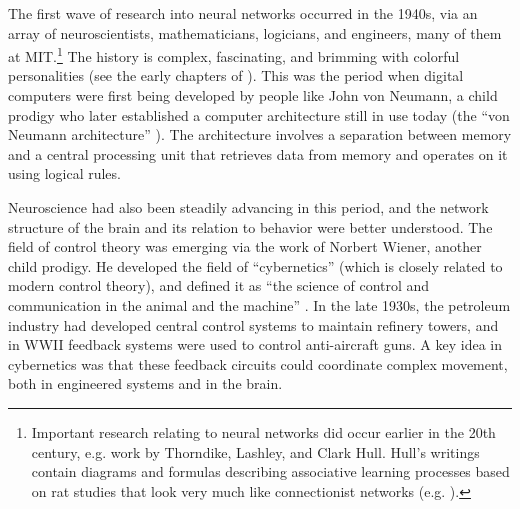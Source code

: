 The first wave of research into neural networks occurred in the 1940s, via an array of neuroscientists, mathematicians, logicians, and engineers, many of them at MIT.\footnote{Important research relating to neural networks did occur earlier in the 20th century, e.g. work by Thorndike, Lashley, and Clark Hull. Hull's writings contain diagrams and formulas describing associative learning processes based on rat studies that look very much like connectionist networks (e.g. ).}   The history is complex, fascinating, and brimming with colorful personalities (see the early chapters of \cite{anderson2000talking}). This was the period when digital computers were first being developed by people like John von Neumann, a child prodigy who  later established a computer architecture still in use today (the ``von Neumann architecture'' \cite{von1981principles}). The architecture involves a separation between memory and a central processing unit that retrieves data from memory and operates on it using logical rules.

Neuroscience had also been steadily advancing in this period, and the network structure of the brain and its relation to behavior were better understood. The field of control theory was emerging via the work of Norbert Wiener, another child prodigy. He developed the field of ``cybernetics'' (which is closely related to modern control theory), and defined it as ``the science of control and communication in the animal and the machine'' \cite[p.~16]{wiener1948cybernetics}. In the late 1930s, the petroleum industry had developed central control systems to maintain refinery towers, and in WWII feedback systems were used to control anti-aircraft guns. A key idea in cybernetics was that these feedback circuits could coordinate complex movement, both in engineered systems and in the brain.


